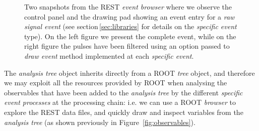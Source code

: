\begin{figure}[h]
  \centering
	\caption{Two snapshots from the REST \emph{event browser} where we observe the control panel and the drawing pad showing an event entry for a \emph{raw signal event} (see section\,\ref{sec:libraries} for details on the \emph{specific event} type). On the left figure we present the complete event, while on the right figure the pulses have been filtered using an option passed to \emph{draw event} method implemented at each \emph{specific event}.}\label{fig:eventBrowser}
\end{figure}


The \emph{analysis tree} object inherits directly from a ROOT \emph{tree} object, and therefore we may exploit all the resources provided by ROOT when analysing the observables that have been added to the \emph{analysis tree} by the different \emph{specific event processes} at the processing chain: i.e. we can use a ROOT \emph{browser} to explore the REST data files, and quickly draw and inspect variables from the \emph{analysis tree} (as shown previously in Figure~\ref{fig:observables}).

